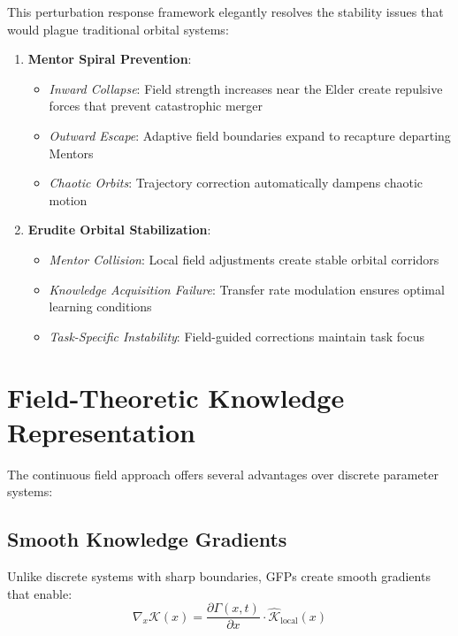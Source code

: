 This perturbation response framework elegantly resolves the stability issues that would plague traditional orbital systems:

\begin{enumerate}
    \item \textbf{Mentor Spiral Prevention}: 
    \begin{itemize}
        \item \textit{Inward Collapse}: Field strength increases near the Elder create repulsive forces that prevent catastrophic merger
        \item \textit{Outward Escape}: Adaptive field boundaries expand to recapture departing Mentors
        \item \textit{Chaotic Orbits}: Trajectory correction automatically dampens chaotic motion
    \end{itemize}
    
    \item \textbf{Erudite Orbital Stabilization}:
    \begin{itemize}
        \item \textit{Mentor Collision}: Local field adjustments create stable orbital corridors
        \item \textit{Knowledge Acquisition Failure}: Transfer rate modulation ensures optimal learning conditions
        \item \textit{Task-Specific Instability}: Field-guided corrections maintain task focus
    \end{itemize}
\end{enumerate}

\section{Field-Theoretic Knowledge Representation}

The continuous field approach offers several advantages over discrete parameter systems:

\subsection{Smooth Knowledge Gradients}

Unlike discrete systems with sharp boundaries, GFPs create smooth gradients that enable:
\begin{equation}
\nabla_x \mathcal{K}(x) = \frac{\partial \Gamma(x,t)}{\partial x} \cdot \hat{\mathcal{K}}_{\text{local}}(x)
\end{equation}

